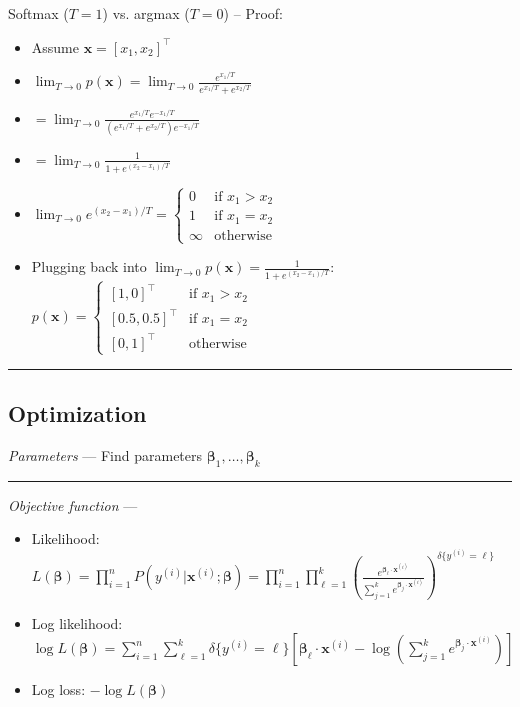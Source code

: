 Softmax ($T=1$) vs. argmax ($T=0$) – Proof:
\begin{itemize}
    \item Assume $\boldsymbol{x} = [x_1, x_2]^\intercal$
    \item $\lim_{T \to 0} p(\boldsymbol{x}) = \lim_{T \to 0} \frac{e^{x_1 / T}}{e^{x_1 / T} + e^{x_2 / T}}$
    \item $= \lim_{T \to 0} \frac{e^{x_1 / T}e^{-x_1 / T}}{(e^{x_1 / T} + e^{x_2 / T})e^{-x_1 / T}}$
    \item $= \lim_{T \to 0} \frac{1}{1 + e^{(x_2 - x_1) / T}}$
    \item $\lim_{T \to 0} e^{(x_2 - x_1) / T} =
  \begin{cases}
    0 & \textrm{if } x_1 > x_2 \\
    1 & \textrm{if } x_1 = x_2 \\
    \infty & \textrm{otherwise}
  \end{cases}$
  \item Plugging back into $\lim_{T \to 0} p(\boldsymbol{x}) =\frac{1}{1 + e^{(x_2 - x_1) / T}}$:
  $
  p(\boldsymbol{x}) =
  \begin{cases}
    [1, 0]^\intercal & \textrm{if } x_1 > x_2 \\
    [0.5, 0.5]^\intercal & \textrm{if } x_1 = x_2\\
    [0, 1]^\intercal & \textrm{otherwise}
  \end{cases}
  $ 
\end{itemize}

{\color{black}\hrule height 0.001mm}

\subsection*{Optimization}
\emph{Parameters} --- Find parameters $\boldsymbol{\beta}_1, \dots, \boldsymbol{\beta}_k$

{\color{lightgray}\hrule height 0.001mm}

\emph{Objective function} --- 
\begin{itemize}
    \item Likelihood: 
    $
    L(\boldsymbol{\beta}) = \prod_{i=1}^n P(y^{(i)} | \boldsymbol{x}^{(i)}; \boldsymbol{\beta})
    = \prod_{i=1}^n \prod_{\ell=1}^k ( \frac{e^{\boldsymbol{\beta}_{\ell} \cdot \boldsymbol{x}^{(i)}}}{\sum_{j=1}^k e^{\boldsymbol{\beta}_j \cdot \boldsymbol{x}^{(i)}}} )^{\delta\{y^{(i)} = \ell\}}
    $
    \item Log likelihood:
    $
    \log L(\boldsymbol{\beta}) = \sum_{i=1}^n \sum_{\ell=1}^k \delta\{y^{(i)} = \ell\} [ \boldsymbol{\beta}_{\ell} \cdot \boldsymbol{x}^{(i)} - \log ( \sum_{j=1}^k e^{\boldsymbol{\beta}_j \cdot \boldsymbol{x}^{(i)}} ) ]
    $
    \item Log loss:
    $
    -\log L(\boldsymbol{\beta})
    $
\end{itemize}

